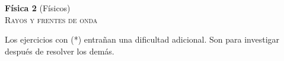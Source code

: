 \documentclass[11pt,spanish,a4paper]{article}
\begin{document}
\begin{center}
	\textbf{Física 2} (Físicos) \hfill {}\\
	\textsc{\LARGE Rayos y frentes de onda}
\end{center}

Los ejercicios con (*) entrañan una dificultad adicional. Son para investigar después de resolver los demás.


\begin{enumerate}







% 


\end{enumerate}
\end{document}

